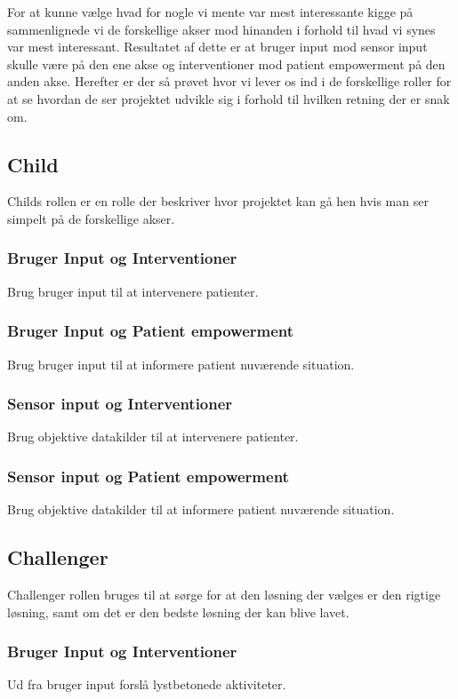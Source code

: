 For at kunne vælge hvad for nogle vi mente var mest interessante kigge på sammenlignede vi de forskellige akser mod hinanden i forhold til hvad vi synes var mest interessant.
Resultatet af dette er at bruger input mod sensor input skulle være på den ene akse og interventioner mod patient empowerment på den anden akse.
Herefter er der så prøvet hvor vi lever os ind i de forskellige roller for at se hvordan de ser projektet udvikle sig i forhold til hvilken retning der er snak om.

\subsection{Child}
Childs rollen er en rolle der beskriver hvor projektet kan gå hen hvis man ser simpelt på de forskellige akser.

\subsubsection*{Bruger Input og Interventioner}
Brug bruger input til at intervenere patienter.
\subsubsection*{Bruger Input og Patient empowerment}
Brug bruger input til at informere patient nuværende situation.
\subsubsection*{Sensor input og Interventioner}
Brug objektive datakilder til at intervenere patienter. 
\subsubsection*{Sensor input og Patient empowerment}
Brug objektive datakilder til at informere patient nuværende situation.

\subsection{Challenger}
Challenger rollen bruges til at sørge for at den løsning der vælges er den rigtige løsning, samt om det er den bedste løsning der kan blive lavet.

\subsubsection*{Bruger Input og Interventioner}
Ud fra bruger input forslå lystbetonede aktiviteter.
